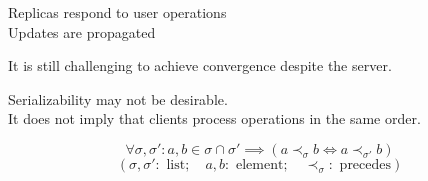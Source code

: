 
\appendix

\begin{frame}{}
  \centerline{}
\end{frame}

\begin{frame}{}
  \centerline{\Large {}}
  \vspace{-0.20cm}
  

  \pause
  \vspace{-0.50cm}
  \begin{center}
    Replicas respond to user operations   \\[3pt]

    Updates are propagated 
  \end{center}
\end{frame}

\begin{frame}{}
  \centerline{It is still challenging to achieve convergence despite the server.}
  

  \begin{center}
    Serializability may not be desirable. \\[6pt]
    It does not imply that clients process operations in the same order.
  \end{center}
\end{frame}

\begin{frame}{}
  \[
    \forall \sigma, \sigma': a, b \in \sigma \cap \sigma' \implies (a \prec_{\sigma} b \iff a \prec_{\sigma'} b)
  \]
  \[
    (\sigma, \sigma': \text{ list}; \quad a, b: \text{ element}; \quad \prec_{\sigma}: \text{ precedes})
  \]

  \begin{columns}
      \vspace{-0.60cm}
      \vspace{-0.60cm}
  \end{columns}
\end{frame}

